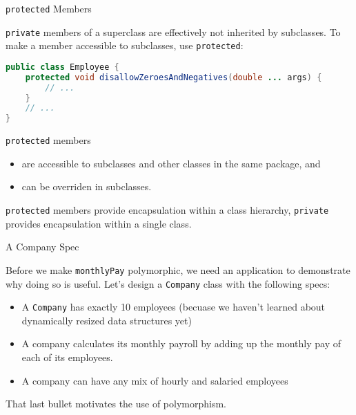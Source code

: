 \documentclass{beamer}
\begin{document}
\begin{frame}[fragile]{{\tt protected} Members}


{\tt private} members of a superclass are effectively not inherited by subclasses.  To make a member accessible to subclasses, use {\tt protected}:
\begin{lstlisting}[language=Java]
public class Employee {
    protected void disallowZeroesAndNegatives(double ... args) {
        // ...
    }
    // ...
}
\end{lstlisting}
{\tt protected} members
\begin{itemize}
\item are accessible to subclasses and other classes in the same package, and
\item can be overriden in subclasses.
\end{itemize}
{\tt protected} members provide encapsulation within a class hierarchy, {\tt private} provides encapsulation within a single class.

\end{frame}

\begin{frame}[fragile]{A Company Spec}


Before we make {\tt monthlyPay} polymorphic, we need an application to demonstrate why doing so is useful.  Let's design a {\tt Company} class with the following specs:

\begin{itemize}
\item A {\tt Company} has exactly 10 employees (becuase we haven't learned about dynamically resized data structures yet)
\item A company calculates its monthly payroll by adding up the monthly pay of each of its employees.
\item A company can have any mix of hourly and salaried employees
\end{itemize}

That last bullet motivates the use of polymorphism.

\end{frame}
\end{document}
